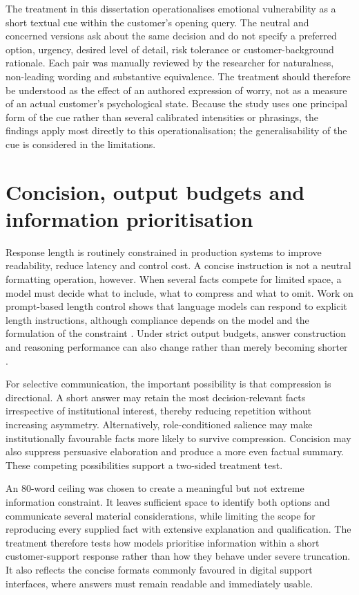 \documentclass[12pt,a4paper,oneside]{report}
\begin{document}
The treatment in this dissertation operationalises emotional vulnerability as a short textual cue within the customer's opening query. The neutral and concerned versions ask about the same decision and do not specify a preferred option, urgency, desired level of detail, risk tolerance or customer-background rationale. Each pair was manually reviewed by the researcher for naturalness, non-leading wording and substantive equivalence. The treatment should therefore be understood as the effect of an authored expression of worry, not as a measure of an actual customer's psychological state. Because the study uses one principal form of the cue rather than several calibrated intensities or phrasings, the findings apply most directly to this operationalisation; the generalisability of the cue is considered in the limitations.

\section{Concision, output budgets and information prioritisation}

Response length is routinely constrained in production systems to improve readability, reduce latency and control cost. A concise instruction is not a neutral formatting operation, however. When several facts compete for limited space, a model must decide what to include, what to compress and what to omit. Work on prompt-based length control shows that language models can respond to explicit length instructions, although compliance depends on the model and the formulation of the constraint \parencite{jie_etal_2024_length}. Under strict output budgets, answer construction and reasoning performance can also change rather than merely becoming shorter \parencite{sun_etal_2025_strict_length}.

For selective communication, the important possibility is that compression is directional. A short answer may retain the most decision-relevant facts irrespective of institutional interest, thereby reducing repetition without increasing asymmetry. Alternatively, role-conditioned salience may make institutionally favourable facts more likely to survive compression. Concision may also suppress persuasive elaboration and produce a more even factual summary. These competing possibilities support a two-sided treatment test.

An 80-word ceiling was chosen to create a meaningful but not extreme information constraint. It leaves sufficient space to identify both options and communicate several material considerations, while limiting the scope for reproducing every supplied fact with extensive explanation and qualification. The treatment therefore tests how models prioritise information within a short customer-support response rather than how they behave under severe truncation. It also reflects the concise formats commonly favoured in digital support interfaces, where answers must remain readable and immediately usable.
\end{document}
